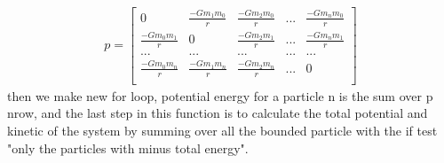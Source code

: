 \documentclass[10pt,a4paper]{article}
\begin{document}
\begin{align}
p=
\begin{bmatrix}
0 & \frac{-Gm_1m_0}{r} & \frac{-Gm_2m_0}{r} & ... & \frac{-Gm_nm_0}{r}  \\
\frac{-Gm_0m_1}{r} & 0 & \frac{-Gm_2m_1}{r} & ... & \frac{-Gm_nm_1}{r}  \\
... & ... & ... & ... & ... \\
\frac{-Gm_0m_n}{r} & \frac{-Gm_1m_n}{r} & \frac{-Gm_2m_n}{r} & ... & 0  \\
\end{bmatrix}
\end{align} 
then we make new for loop, potential energy for a particle n is the sum over p nrow, and the last step in this function is to calculate the total potential and kinetic of the system by summing over all the bounded particle with the if test "only the particles with minus total energy". 
\end{document}
